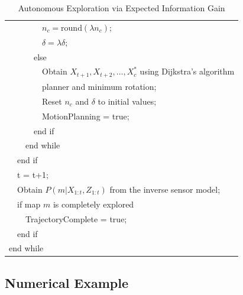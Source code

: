 \documentclass[letterpaper, 10pt, conference]{ieeeconf}
\newcommand{\braces}[1]{\ensuremath{\left\{ #1 \right\}}}
\newcommand{\argmin}{\operatornamewithlimits{argmin}}
\newcommand{\argmax}{\operatornamewithlimits{argmax}}
\begin{document}
\begin{table}
\begin{tabular}{ l }
  \ \ \ \ \ \ \ \ $n_c=\text{round}(\lambda n_c)$;\\
  \ \ \ \ \ \ \ \ $\delta=\lambda \delta$;\\
  \ \ \ \ \ \ else\\
  \ \ \ \ \ \ \ \ Obtain $X_{t+1},X_{t+2},\ldots,X_{c}^*$ using Dijkstra's algorithm\\  \ \ \ \ \ \ \ \ planner and minimum rotation;\\
  \ \ \ \ \ \ \ \ Reset $n_c$ and $\delta$ to initial values;\\
  \ \ \ \ \ \ \ \ MotionPlanning = true;\\  
  \ \ \ \ \ \ end if\\
  \ \ \ \ end while\\
  \ \ end if\\
  \ \ t = t+1;\\
  \ \ Obtain $P(m|X_{1:t},Z_{1:t})$ from the inverse sensor model;\\
  \ \ if map $m$ is completely explored\\
  \ \ \ \ TrajectoryComplete = true;\\
  \ \ end if\\
  end while


\end{tabular}
\caption{Autonomous Exploration via Expected Information Gain}
\label{tab:Alg_AutomousExploration}
\end{table}



\subsection{Numerical Example}
\end{document}
